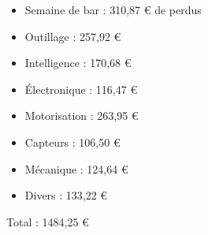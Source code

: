 \begin{frame}
   \begin{itemize}
      \item Semaine de bar : 310,87 € de perdus
      \item Outillage : 257,92 €
      \item Intelligence : 170,68 €
      \item Électronique : 116,47 €
      \item Motorisation : 263,95 €
      \item Capteurs : 106,50 €
      \item Mécanique : 124,64 €
      \item Divers : 133,22 €
   \end{itemize} 
Total : 1484,25 €
\end{frame}
